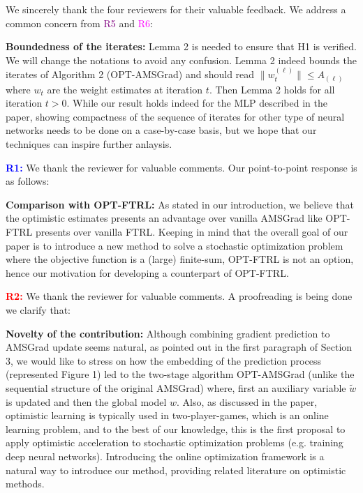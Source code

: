 \documentclass{article}
\begin{document}
We sincerely thank the four reviewers for their valuable feedback. We address a common concern from \textcolor{purple}{R5} and \textcolor{magenta}{R6}:

\textbf{Boundedness of the iterates:}  Lemma 2 is needed to ensure that H1 is verified. We will change the notations to avoid any confusion. Lemma 2 indeed bounds the iterates of Algorithm 2 (OPT-AMSGrad) and should read $\|w_t^{(\ell)} \| \leq A_{(\ell)}$ where $w_t$ are the weight estimates at iteration $t$. 
Then Lemma 2 holds for all iteration $t>0$.
While our result holds indeed for the MLP described in the paper, showing compactness of the sequence of iterates for other type of neural networks needs to be done on a case-by-case basis, but we hope that our techniques can inspire further anlaysis.

\vspace{0.01in}

\textbf{\textcolor{blue}{R1:}} We thank the reviewer for valuable comments. Our point-to-point response is as follows:\vspace{-5pt}


\textbf{Comparison with OPT-FTRL:} As stated in our introduction, we believe that the optimistic estimates presents an advantage over vanilla AMSGrad like OPT-FTRL presents over vanilla FTRL.
Keeping in mind that the overall goal of our paper is to introduce a new method to solve a stochastic optimization problem where the objective function is a (large) finite-sum, OPT-FTRL is not an option, hence our motivation for developing a counterpart of OPT-FTRL.

\vspace{0.01in}


\textbf{\textcolor{red}{R2:}} We thank the reviewer for valuable comments. A proofreading is being done we clarify that:\vspace{-5pt}

\textbf{Novelty of the contribution:} 
Although combining gradient prediction to AMSGrad update seems natural, as pointed out in the first paragraph of Section 3, we would like to stress on how the embedding of the prediction process (represented Figure 1) led to the two-stage algorithm OPT-AMSGrad (unlike the sequential structure of the original AMSGrad) where, first an auxiliary variable $\tilde{w}$ is updated and then the global model $w$. 
Also, as discussed in the paper, optimistic learning is typically used in two-player-games, which is an online learning problem, and to the best of our knowledge, this is the first proposal to apply optimistic acceleration to stochastic optimization problems (e.g. training deep neural networks). 
Introducing the online optimization framework is a natural way to introduce our method, providing related literature on optimistic methods.\vspace{-5pt}
\end{document}
